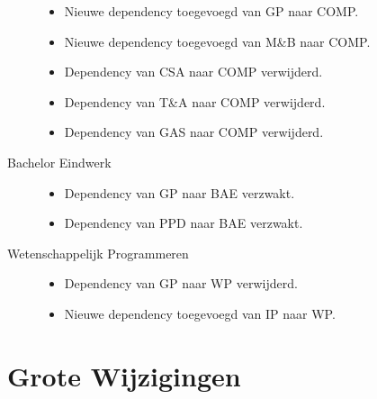 \documentclass[a4paper]{article}
\begin{document}
\begin{multicols*}{2}
\begin{description}
\begin{itemize}
                    \item Nieuwe dependency toegevoegd van GP naar COMP.
                    \item Nieuwe dependency toegevoegd van M\&B naar COMP.
                    \item Dependency van CSA naar COMP verwijderd.
                    \item Dependency van T\&A naar COMP verwijderd.
                    \item Dependency van GAS naar COMP verwijderd.
            \end{itemize}
            \pagebreak[3]
            \item[Bachelor Eindwerk] \hfill
            \begin{itemize}
                    \item Dependency van GP naar BAE verzwakt.
                    \item Dependency van PPD naar BAE verzwakt.
            \end{itemize}
            \pagebreak[3]
            \item[Wetenschappelijk Programmeren] \hfill
            \begin{itemize}
                    \item Dependency van GP naar WP verwijderd.
                    \item Nieuwe dependency toegevoegd van IP naar WP.
            \end{itemize}
        \end{description}
    \end{multicols*}

    \restoregeometry

    \newpage
    \section{Grote Wijzigingen}
    \label{sec:grote_wijzigingen}
\end{document}
